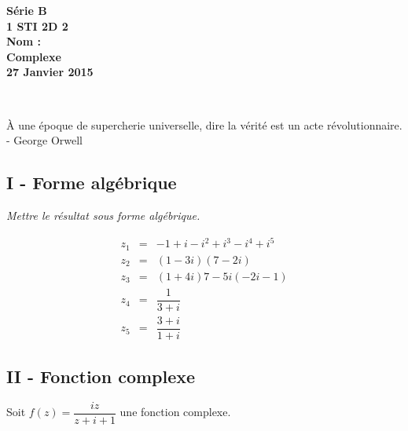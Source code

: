 \documentclass[12pt]{article}
\begin{document}

\begin{minipage}[t]{\textwidth}
  \raggedright
      {\bfseries Série B}\\[.35ex]
      {\bfseries 1 STI 2D 2}\\[.35ex]
      {\bfseries Nom : }\\[.35ex]
      \vspace*{-1cm}
      \raggedleft
          {\bfseries Complexe}\\[.35ex]
          {\bfseries 27 Janvier 2015}\\[.35ex]
\end{minipage}\\[1em]

\begin{center}
  \textsf{À une époque de supercherie universelle, dire la vérité est un acte révolutionnaire. - George Orwell}\\
\end{center}

\setlength{\columnseprule}{0pt}

\subsection*{I - Forme algébrique}

\textit{Mettre le résultat sous forme algébrique.}

\begin{eqnarray*}
  z_1 &=& - 1 + i - i^{2} + i^{3} - i^{4} + i^{5}\\
  z_2 &=& (1-3i)(7-2i)\\
  z_3 &=& (1+4i)7 - 5i(-2i-1)\\
  z_4 &=& \dfrac{1}{3+i}\\
  z_5 &=& \dfrac{3+i}{1+i}
\end{eqnarray*}

\subsection*{II - Fonction complexe}

Soit $f(z) = \dfrac{i z}{z + i + 1}$ une fonction complexe.
\end{document}
